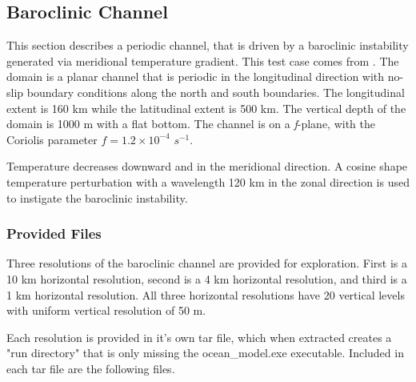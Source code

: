\subsection{Baroclinic Channel}
\label{subsec:baroclinic_channel_description}
This section describes a periodic channel, that is driven by a baroclinic
instability generated via meridional temperature gradient. This test case comes from
\cite{Ilicak_ea12om}. The domain is a planar channel that is periodic in the
longitudinal direction with no-slip boundary conditions along the north and
south boundaries. The longitudinal extent is 160 km while the
latitudinal extent is 500 km. The vertical depth of the domain is 1000 m with a
flat bottom. The channel is on a {\it f}-plane, with the Coriolis parameter $f
= 1.2 \times 10^{-4}$ $s^{-1}$.

Temperature decreases downward and in the meridional direction. A cosine shape temperature
perturbation with a
wavelength 120 km in the zonal direction is used to instigate the baroclinic instability.

\subsubsection{Provided Files}
\label{subsubsec:baroclinic_channel_files}
Three resolutions of the baroclinic channel are provided for exploration. First
is a 10 km horizontal resolution, second is a 4 km horizontal resolution, and
third is a 1 km horizontal resolution. All three horizontal resolutions have 20
vertical levels with uniform vertical resolution of 50 m.

Each resolution is provided in it's own tar file, which when extracted creates
a "run directory" that is only missing the ocean\_model.exe executable.
Included in each tar file are the following files.

